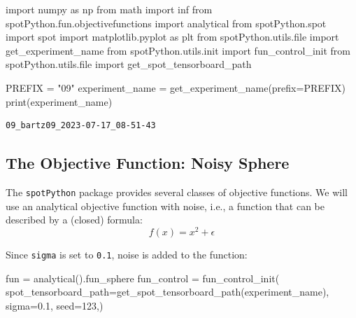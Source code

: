 \documentclass[
  letterpaper,
  DIV=11,
  numbers=noendperiod]{scrreprt}
\newenvironment{Shaded}{\begin{snugshade}}{\end{snugshade}}
\newcommand{\BuiltInTok}[1]{\textcolor[rgb]{0.00,0.23,0.31}{#1}}
\newcommand{\DecValTok}[1]{\textcolor[rgb]{0.68,0.00,0.00}{#1}}
\newcommand{\FloatTok}[1]{\textcolor[rgb]{0.68,0.00,0.00}{#1}}
\newcommand{\ImportTok}[1]{\textcolor[rgb]{0.00,0.46,0.62}{#1}}
\newcommand{\NormalTok}[1]{\textcolor[rgb]{0.00,0.23,0.31}{#1}}
\newcommand{\OperatorTok}[1]{\textcolor[rgb]{0.37,0.37,0.37}{#1}}
\newcommand{\StringTok}[1]{\textcolor[rgb]{0.13,0.47,0.30}{#1}}
\begin{document}
\begin{Shaded}
\begin{Highlighting}[]
\ImportTok{import}\NormalTok{ numpy }\ImportTok{as}\NormalTok{ np}
\ImportTok{from}\NormalTok{ math }\ImportTok{import}\NormalTok{ inf}
\ImportTok{from}\NormalTok{ spotPython.fun.objectivefunctions }\ImportTok{import}\NormalTok{ analytical}
\ImportTok{from}\NormalTok{ spotPython.spot }\ImportTok{import}\NormalTok{ spot}
\ImportTok{import}\NormalTok{ matplotlib.pyplot }\ImportTok{as}\NormalTok{ plt}
\ImportTok{from}\NormalTok{ spotPython.utils.}\BuiltInTok{file} \ImportTok{import}\NormalTok{ get\_experiment\_name}
\ImportTok{from}\NormalTok{ spotPython.utils.init }\ImportTok{import}\NormalTok{ fun\_control\_init}
\ImportTok{from}\NormalTok{ spotPython.utils.}\BuiltInTok{file} \ImportTok{import}\NormalTok{ get\_spot\_tensorboard\_path}

\NormalTok{PREFIX }\OperatorTok{=} \StringTok{"09"}
\NormalTok{experiment\_name }\OperatorTok{=}\NormalTok{ get\_experiment\_name(prefix}\OperatorTok{=}\NormalTok{PREFIX)}
\BuiltInTok{print}\NormalTok{(experiment\_name)}
\end{Highlighting}
\end{Shaded}

\begin{verbatim}
09_bartz09_2023-07-17_08-51-43
\end{verbatim}

\hypertarget{the-objective-function-noisy-sphere-1}{%
\subsection{The Objective Function: Noisy
Sphere}\label{the-objective-function-noisy-sphere-1}}

The \texttt{spotPython} package provides several classes of objective
functions. We will use an analytical objective function with noise,
i.e., a function that can be described by a (closed) formula:
\[f(x) = x^2 + \epsilon\]

Since \texttt{sigma} is set to \texttt{0.1}, noise is added to the
function:

\begin{Shaded}
\begin{Highlighting}[]
\NormalTok{fun }\OperatorTok{=}\NormalTok{ analytical().fun\_sphere}
\NormalTok{fun\_control }\OperatorTok{=}\NormalTok{ fun\_control\_init(}
\NormalTok{    spot\_tensorboard\_path}\OperatorTok{=}\NormalTok{get\_spot\_tensorboard\_path(experiment\_name),}
\NormalTok{    sigma}\OperatorTok{=}\FloatTok{0.1}\NormalTok{,}
\NormalTok{    seed}\OperatorTok{=}\DecValTok{123}\NormalTok{,)}
\end{Highlighting}
\end{Shaded}
\end{document}
